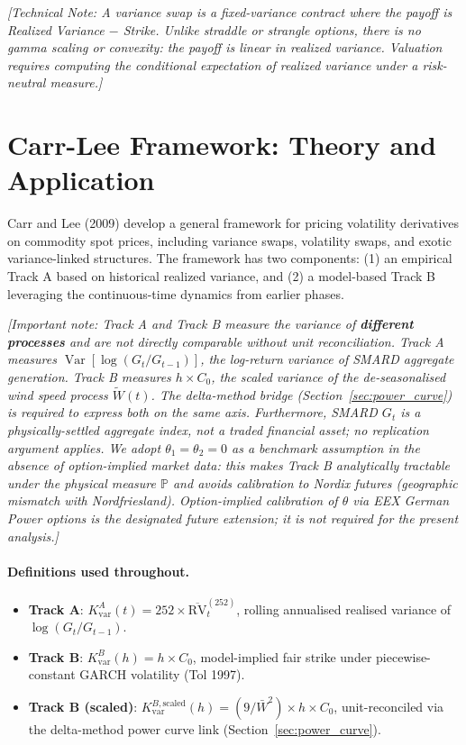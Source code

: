 \documentclass[11pt, a4paper, twoside]{article}
\begin{document}
\textit{[Technical Note: A variance swap is a fixed-variance contract where the payoff is Realized Variance $-$ Strike. Unlike straddle or strangle options, there is no gamma scaling or convexity: the payoff is linear in realized variance. Valuation requires computing the conditional expectation of realized variance under a risk-neutral measure.]}

\section{Carr-Lee Framework: Theory and Application}

Carr and Lee (2009) develop a general framework for pricing volatility derivatives on commodity spot prices, including variance swaps, volatility swaps, and exotic variance-linked structures. The framework has two components: (1) an empirical Track A based on historical realized variance, and (2) a model-based Track B leveraging the continuous-time dynamics from earlier phases.

\textit{[Important note: Track A and Track B measure the variance of \textbf{different processes} and are not directly comparable without unit reconciliation. Track A measures $\operatorname{Var}[\log(G_t/G_{t-1})]$, the log-return variance of SMARD aggregate generation. Track B measures $h \times C_0$, the scaled variance of the de-seasonalised wind speed process $\tilde{W}(t)$. The delta-method bridge (Section~\ref{sec:power_curve}) is required to express both on the same axis. Furthermore, SMARD $G_t$ is a physically-settled aggregate index, not a traded financial asset; no replication argument applies. We adopt $\theta_1 = \theta_2 = 0$ as a benchmark assumption in the absence of option-implied market data: this makes Track B analytically tractable under the physical measure $\mathbb{P}$ and avoids calibration to Nordix futures (geographic mismatch with Nordfriesland). Option-implied calibration of $\theta$ via EEX German Power options is the designated future extension; it is not required for the present analysis.]}

\paragraph{Definitions used throughout.}
\begin{itemize}
  \item \textbf{Track A}: $K_{\text{var}}^A(t) = 252 \times \overline{\mathrm{RV}}_t^{(252)}$, rolling annualised realised variance of $\log(G_t/G_{t-1})$.
  \item \textbf{Track B}: $K_{\text{var}}^B(h) = h \times C_0$, model-implied fair strike under piecewise-constant GARCH volatility (Tol 1997).
  \item \textbf{Track B (scaled)}: $K_{\text{var}}^{B,\text{scaled}}(h) = (9/\bar{W}^2) \times h \times C_0$, unit-reconciled via the delta-method power curve link (Section~\ref{sec:power_curve}).
\end{itemize}
\end{document}
